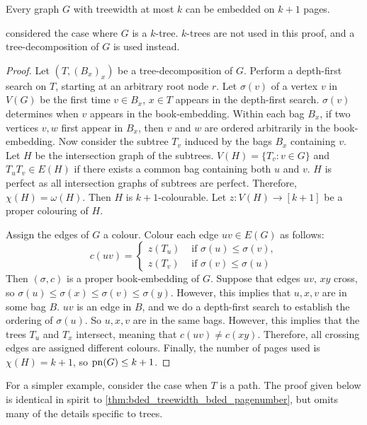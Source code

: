 \begin{theorem}\label{thm:bded_treewidth_bded_pagenumber}
	Every graph \(G\) with treewidth at most $k$ can be embedded on $k + 1$ pages.
\end{theorem}
\textcite{ganleyPagenumberTrees2001} considered the case where \(G\) is a \(k\)-tree. $k$-trees are not used in this proof, and a tree-decomposition of \(G\) is used instead. 

\begin{proof}
	Let  $(T, (B_x)_x)$ be a tree-decomposition of \(G\). Perform a depth-first search on \(T\), starting at an arbitrary root node \(r\). Let \(\sigma(v)\) of a vertex \(v\) in \(V(G)\) be the first time \(v \in B_x\), $x \in T$ appears in the depth-first search. $\sigma(v)$ determines when $v$ appears in the book-embedding. Within each bag $B_x$, if two vertices $v,w$ first appear in $B_x$, then $v$ and $w$ are ordered arbitrarily in the book-embedding. Now consider the subtree \(T_v\) induced by the bags \(B_x\) containing \(v\). Let \(H\) be the intersection graph of the subtrees. \(V(H) = \lbrace T_v : v \in G \rbrace\) and \(T_u T_v \in E(H)\) if there exists a common bag containing both $u$ and $v$. \(H\) is perfect as all intersection graphs of subtrees are perfect. Therefore, \(\chi(H) = \omega(H)\). Then \(H\) is \(k + 1\)-colourable. Let $z: V(H) \rightarrow [k + 1]$ be a proper colouring of $H$. 

	Assign the edges of \(G\) a colour. Colour each edge \(uv \in E(G)\) as follows:
	\begin{equation}
		c(uv) =
		\begin{cases}
			z(T_u) & \text{ if } \sigma(u) \leq \sigma(v), \\
			z(T_v) & \text{ if } \sigma(v) \leq \sigma(u)
		\end{cases}
	\end{equation}
	Then $(\sigma, c)$ is a proper book-embedding of \(G\). Suppose that edges \(uv\), \(xy\) cross, so \(\sigma(u) \leq \sigma(x) \leq \sigma(v) \leq \sigma(y)\). However, this implies that $u,x,v$ are in some bag $B$. \(uv\) is an edge in \(B\), and we do a depth-first search to establish the ordering of $\sigma(u)$. So \(u, x, v\) are in the same bags. However, this implies that the trees \(T_u\) and \(T_x\) intersect, meaning that \(c(uv) \neq c(xy)\). Therefore, all crossing edges are assigned different colours. Finally, the number of pages used is \(\chi(H) = k + 1\), so \(\operatorname{pn}(G) \leq k + 1\). 
\end{proof}
For a simpler example, consider the case when $T$ is a path. The proof given below is identical in spirit to \cref{thm:bded_treewidth_bded_pagenumber}, but omits many of the details specific to trees.

